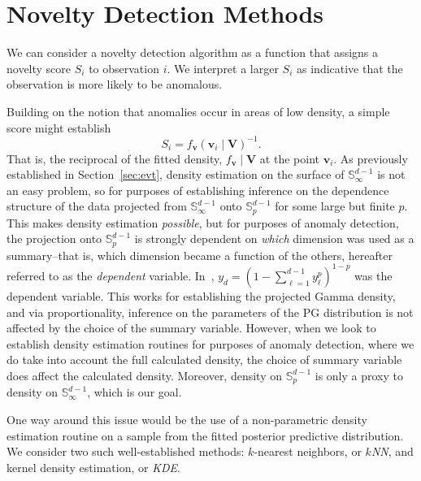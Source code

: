 \section{Novelty Detection Methods\label{sec:novelty}}
We can consider a novelty detection algorithm as a function that assigns a
  novelty score $S_i$ to observation $i$.  We interpret a larger $S_i$
  as indicative that the observation is more likely to be anomalous.

Building on the notion that anomalies occur in areas of low density, a simple
  score might establish
  \[
      S_i = f_{\bm{v}}(\bm{v}_i\mid \bm{V})^{-1}.  
  \]
  That is, the reciprocal of the fitted density, $f_{\bm{v}}\mid \bm{V}$ at the 
  point $\bm{v}_i$.
  As previously established in Section~\ref{sec:evt}, density estimation on the 
  surface of ${\mathbb S}_{\infty}^{d-1}$ is not an easy problem, so for 
  purposes of establishing inference on the dependence structure of the data 
  projected from ${\mathbb S}_{\infty}^{d-1}$ onto ${\mathbb S}_p^{d-1}$ for 
  some large but finite $p$.  This makes density estimation \emph{possible}, but 
  for purposes of anomaly detection, the projection onto ${\mathbb S}_p^{d-1}$ is 
  strongly dependent on \emph{which} dimension was used as a summary--that is, 
  which dimension became a function of the others, hereafter referred to as the 
  \emph{dependent} variable. In~\cite{trubey:pg}, 
  $y_d = (1 - \sum_{\ell = 1}^{d-1}y_{\ell}^p)^{1-p}$ was the dependent variable.
  This works for establishing the projected Gamma density, and via 
  proportionality, inference on the parameters of the PG distribution is not affected
  by the choice of the summary variable. However, when we look to establish 
  density estimation routines for purposes of anomaly detection, where we do 
  take into account the full calculated density, the choice of summary variable 
  does affect the calculated density.  Moreover, density on $\mathbb{S}_p^{d-1}$
  is only a proxy to density on $\mathbb{S}_{\infty}^{d-1}$, which is our goal.


One way around this issue would be the use of a non-parametric density estimation
  routine on a sample from the fitted posterior predictive distribution.  We 
  consider two such well-established methods: 
  $k$-nearest neighbors, or \emph{$k$NN}, 
  and kernel density estimation, or \emph{KDE}.

